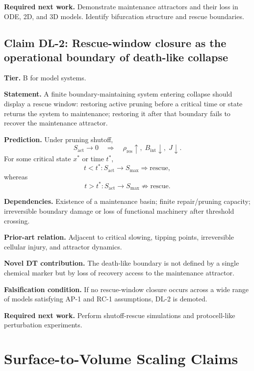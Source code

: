 \documentclass[10pt,a4paper,twocolumn,aps,prl]{revtex4-2}
\theoremstyle{claimstyle}
\theoremstyle{definition}
\newcommand{\claimfield}[1]{\noindent\textbf{#1.}}
\newcommand{\Sactive}{S_{\mathrm{act}}}
\newcommand{\rhodebt}{\rho_{\mathrm{res}}}
\newcommand{\Bint}{B_{\mathrm{int}}}
\newcommand{\Jflow}{J}
\begin{document}
\claimfield{Required next work} Demonstrate maintenance attractors and their loss in ODE, 2D, and 3D models. Identify bifurcation structure and rescue boundaries.

\subsection{Claim DL-2: Rescue-window closure as the operational boundary of death-like collapse}

\claimfield{Tier} B for model systems.

\claimfield{Statement} A finite boundary-maintaining system entering collapse should display a rescue window: restoring active pruning before a critical time or state returns the system to maintenance; restoring it after that boundary fails to recover the maintenance attractor.

\claimfield{Prediction} Under pruning shutoff,
\begin{equation}
\Sactive\rightarrow 0 \quad \Rightarrow \quad \rhodebt\uparrow,\; \Bint\downarrow,\; \Jflow\downarrow.
\end{equation}
For some critical state $x^*$ or time $t^*$,
\begin{equation}
 t<t^*: \Sactive\rightarrow S_{\max} \Rightarrow \text{rescue},
\end{equation}
whereas
\begin{equation}
 t>t^*: \Sactive\rightarrow S_{\max} \not\Rightarrow \text{rescue}.
\end{equation}

\claimfield{Dependencies} Existence of a maintenance basin; finite repair/pruning capacity; irreversible boundary damage or loss of functional machinery after threshold crossing.

\claimfield{Prior-art relation} Adjacent to critical slowing, tipping points, irreversible cellular injury, and attractor dynamics.

\claimfield{Novel DT contribution} The death-like boundary is not defined by a single chemical marker but by loss of recovery access to the maintenance attractor.

\claimfield{Falsification condition} If no rescue-window closure occurs across a wide range of models satisfying AP-1 and RC-1 assumptions, DL-2 is demoted.

\claimfield{Required next work} Perform shutoff-rescue simulations and protocell-like perturbation experiments.

\section{Surface-to-Volume Scaling Claims}
\end{document}
